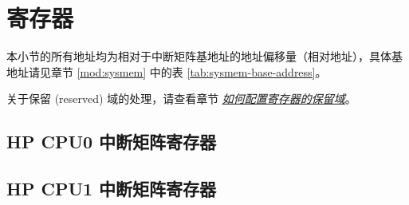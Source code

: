 \documentclass[main\_\_CN.tex]{subfiles}
\begin{document}

\newpage
\section{寄存器}

本小节的所有地址均为相对于中断矩阵基地址的地址偏移量（相对地址），具体基地址请见章节 \ref{mod:sysmem} \textit{} 中的表 \ref{tab:sysmem-base-address}。

关于保留 (reserved) 域的处理，请查看章节 \hyperref[programming-reserved-field]{\textit{如何配置寄存器的保留域}}。


\subsection{HP CPU0 中断矩阵寄存器}
\label{sec: cpu0-intmtrx-reg}


\subsection{HP CPU1 中断矩阵寄存器}
\label{sec: cpu1-intmtrx-reg}

\end{document}
